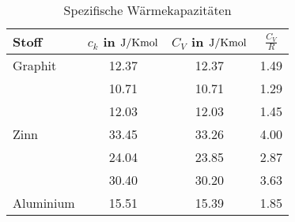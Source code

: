 \begin{table}
 \centering
 \begin{tabular}{lS S S }
 \toprule
 {Stoff} & {{$c_k$ in $\si{\joule \per {\kelvin \mol}}$}} & {{$C_V$ in $\si{\joule \per {\kelvin \mol}}$}}  &  {$\frac{C_V}{R}$}  \\
\midrule
 {Graphit} &  12.37 & 12.37  & 1.49   \\
    &  10.71 & 10.71  & 1.29   \\
    &  12.03 & 12.03  & 1.45   \\
    \hline
{Zinn} & 33.45  & 33.26  & 4.00  \\
  & 24.04  & 23.85  & 2.87  \\
  & 30.40  & 30.20  & 3.63  \\
  \hline
{Aluminium} & 15.51  & 15.39  & 1.85   \\
\bottomrule
 \end{tabular}
 \caption{Spezifische Wärmekapazitäten}
 \label{tab: c_v}
  \end{table}
